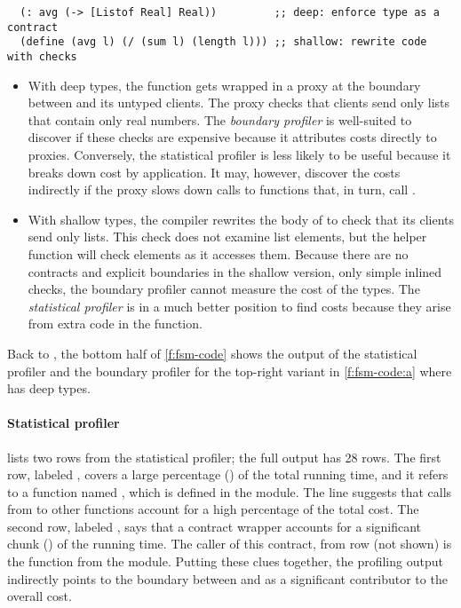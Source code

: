 \begin{verbatim}
  (: avg (-> [Listof Real] Real))         ;; deep: enforce type as a contract
  (define (avg l) (/ (sum l) (length l))) ;; shallow: rewrite code with checks
\end{verbatim}

\begin{itemize}
  \item
    With deep types, the function gets wrapped in a proxy at the boundary
    between  and its untyped clients.
    The proxy checks that clients send only lists that contain
    only real numbers.
    The \emph{boundary profiler} is well-suited to
    discover if these checks are expensive because it attributes costs
    directly to proxies.
    Conversely, the statistical profiler is less
    likely to be useful because it breaks down cost by application.
    It may, however, discover the costs indirectly if the proxy slows
    down calls to functions that, in turn, call .
  \item
    With shallow types, the compiler rewrites the body of  to
    check that its clients send only lists. This check does not examine
    list elements, but the helper function  will check elements
    as it accesses them.
    Because there are no contracts and explicit boundaries
    in the shallow version, only simple inlined checks, the
    boundary profiler cannot measure the cost of the types.
    The \emph{statistical profiler} is in a much better position to find
    costs because they arise from extra code in the function.
\end{itemize}

Back to , 
the bottom half of \cref{f:fsm-code} shows the output of the statistical
profiler and the boundary profiler for the top-right variant in
\cref{f:fsm-code:a} where  has deep types.

\paragraph{Statistical profiler}  lists two
rows from the statistical profiler; the full output has 28 rows.  The
first row, labeled \code{[17]}, covers a large percentage () of the
total running time, and it refers to a function named , which is
defined in the  module. The line suggests that calls from
 to other functions account for a high percentage of the total cost.
The second row, labeled \code{[24]}, says that a contract wrapper accounts for a
significant chunk () of the running time.  The caller of this
contract, from row \code{[19]} (not shown) is the function 
from the  module.  Putting these clues together, the profiling output
indirectly points to the boundary between  and  as a significant
contributor to the overall cost. 

